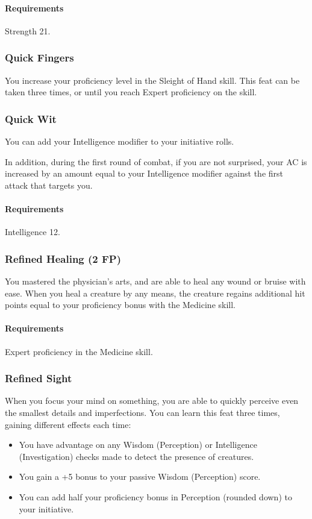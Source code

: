     \paragraph{Requirements} Strength 21.
\subsubsection{Quick Fingers} \label{feat::quickfingers}
    You increase your proficiency level in the Sleight of Hand skill.
    This feat can be taken three times, or until you reach Expert proficiency on the skill.
\subsubsection{Quick Wit} \label{feat::quickwit}
    You can add your Intelligence modifier to your initiative rolls.

    In addition, during the first round of combat, if you are not surprised, your AC is increased by an amount equal to your Intelligence modifier against the first attack that targets you.
    \paragraph{Requirements} Intelligence 12.
\subsubsection{Refined Healing (2 FP)} \label{feat::refinedhealing}
    You mastered the physician's arts, and are able to heal any wound or bruise with ease.
    When you heal a creature by any means, the creature regains additional hit points equal to your proficiency bonus with the Medicine skill.
    \paragraph{Requirements} Expert proficiency in the Medicine skill.
\subsubsection{Refined Sight} \label{feat::refinedsight}
    When you focus your mind on something, you are able to quickly perceive even the smallest details and imperfections.
    You can learn this feat three times, gaining different effects each time:
    \begin{itemize}
        \item You have advantage on any Wisdom (Perception) or Intelligence (Investigation) checks made to detect the presence of creatures.
        \item You gain a +5 bonus to your passive Wisdom (Perception) score.
        \item You can add half your proficiency bonus in Perception (rounded down) to your initiative.
    \end{itemize}
